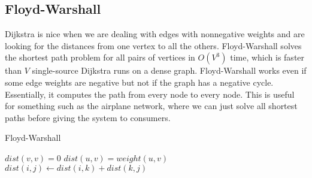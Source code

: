 \documentclass{article}
\begin{document}
\begin{center}
\end{center}

\subsection{Floyd-Warshall}

Dijkstra is nice when we are dealing with edges with nonnegative weights and are looking for the distances from one vertex to all the others. Floyd-Warshall solves the shortest path problem for all pairs of vertices in $O(V^3)$ time, which is faster than $V$ single-source Dijkstra runs on a dense graph. Floyd-Warshall works even if some edge weights are negative but not if the graph has a negative cycle. Essentially, it computes the path from every node to every node. This is useful for something such as the airplane network, where we can just solve all shortest paths before giving the system to consumers.

\begin{algorithm}[H]
\caption{Floyd-Warshall}
\begin{algorithmic}
	\State $dist(v,v)=0$
\EndFor
{}
	\State $dist(u,v)=weight(u,v)$
\EndFor
{}
            	\State $dist(i,j) \gets dist(i,k)+dist(k,j)$
            \EndIf
        \EndFor
    \EndFor
\EndFor
\end{algorithmic}
\end{algorithm}
\end{document}
